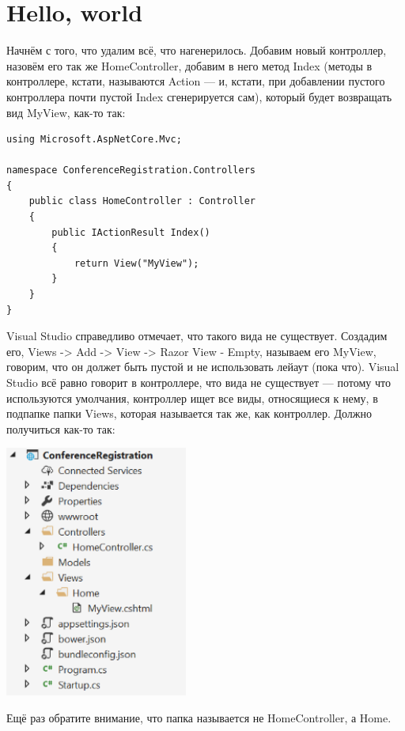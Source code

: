 \documentclass[a5paper]{article}
\begin{document}
\section{Hello, world}

Начнём с того, что удалим всё, что нагенерилось. Добавим новый контроллер, назовём его так же HomeController, добавим в него метод Index (методы в контроллере, кстати, называются Action --- и, кстати, при добавлении пустого контроллера почти пустой Index сгенерируется сам), который будет возвращать вид MyView, как-то так:

\begin{verbatim}
using Microsoft.AspNetCore.Mvc;

namespace ConferenceRegistration.Controllers
{
    public class HomeController : Controller
    {
        public IActionResult Index()
        {
            return View("MyView");
        }
    }
}
\end{verbatim}

Visual Studio справедливо отмечает, что такого вида не существует. Создадим его, Views -> Add -> View -> Razor View - Empty, называем его MyView, говорим, что он должет быть пустой и не использовать лейаут (пока что). Visual Studio всё равно говорит в контроллере, что вида не существует ---
потому что используются умолчания, контроллер ищет все виды, относящиеся к нему, в подпапке папки Views, которая называется так же, как контроллер. Должно получиться как-то так:

\begin{center}
    \includegraphics[width=0.45\textwidth]{projectStructure.png}
\end{center}

Ещё раз обратите внимание, что папка называется не HomeController, а Home.
\end{document}
